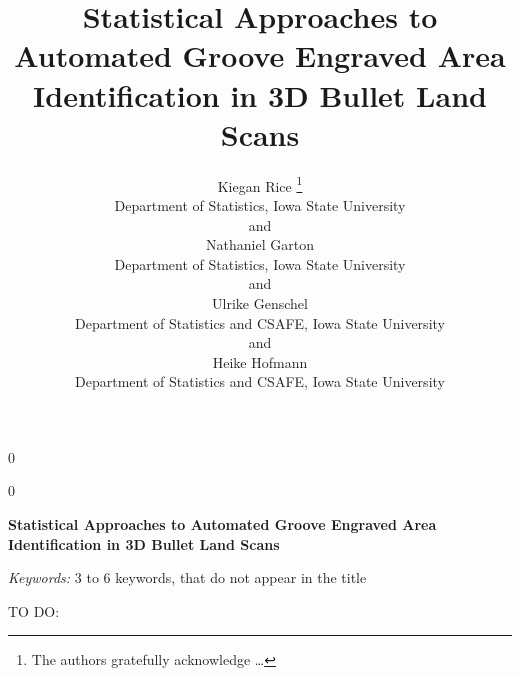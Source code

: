 \documentclass[12pt]{article}
\newcommand{\blind}{0}
\begin{document}
\def\spacingset#1{\renewcommand{\baselinestretch}%
{#1}\small\normalsize} \spacingset{1}




\blind
{
  \title{\bf Statistical Approaches to Automated Groove Engraved Area Identification
in 3D Bullet Land Scans}

  \author{
        Kiegan Rice \thanks{The authors gratefully acknowledge \ldots{}} \\
    Department of Statistics, Iowa State University\\
     and \\     Nathaniel Garton \\
    Department of Statistics, Iowa State University\\
     and \\     Ulrike Genschel \\
    Department of Statistics and CSAFE, Iowa State University\\
     and \\     Heike Hofmann \\
    Department of Statistics and CSAFE, Iowa State University\\
      }
  \maketitle
} \fi

\blind
{
  \bigskip
  \bigskip
  \bigskip
  \begin{center}
    {\LARGE\bf Statistical Approaches to Automated Groove Engraved Area Identification
in 3D Bullet Land Scans}
  \end{center}
  \medskip
} \fi

\bigskip
\begin{abstract}

\end{abstract}

\noindent%
{\it Keywords:} 3 to 6 keywords, that do not appear in the title
\vfill

\newpage
\spacingset{1.45} %

\newcommand{\hh}[1]{{\color{orange}{#1}}}
\newcommand{\kr}[1]{{\color{teal}{#1}}}
\newcommand{\ug}[1]{{\color{purple}{#1}}}
\newcommand{\nate}[1]{{\color{olive}{#1}}}





TO DO:
\end{document}

